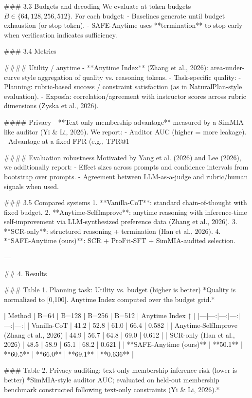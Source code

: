 ### 3.3 Budgets and decoding  
We evaluate at token budgets \(B \in \{64, 128, 256, 512\}\). For each budget:
- Baselines generate until budget exhaustion (or stop token).  
- SAFE-Anytime uses **termination** to stop early when verification indicates sufficiency.

### 3.4 Metrics  

#### Utility / anytime  
- **Anytime Index** (Zhang et al., 2026): area-under-curve style aggregation of quality vs. reasoning tokens.  
- Task-specific quality:
  - Planning: rubric-based success / constraint satisfaction (as in NaturalPlan-style evaluation).  
  - Exposía: correlation/agreement with instructor scores across rubric dimensions (Zyska et al., 2026).

#### Privacy  
- **Text-only membership advantage** measured by a SimMIA-like auditor (Yi & Li, 2026). We report:
  - Auditor AUC (higher = more leakage).  
  - Advantage at a fixed FPR (e.g., TPR@1%

#### Evaluation robustness  
Motivated by Yang et al. (2026) and Lee (2026), we additionally report:
- Effect sizes across prompts and confidence intervals from bootstrap over prompts.  
- Agreement between LLM-as-a-judge and rubric/human signals when used.

### 3.5 Compared systems  
1. **Vanilla-CoT**: standard chain-of-thought with fixed budget.  
2. **Anytime-SelfImprove**: anytime reasoning with inference-time self-improvement via LLM-synthesized preference data (Zhang et al., 2026).  
3. **SCR-only**: structured reasoning + termination (Han et al., 2026).  
4. **SAFE-Anytime (ours)**: SCR + ProFit-SFT + SimMIA-audited selection.

---

## 4. Results  

### Table 1. Planning task: Utility vs. budget (higher is better)  
*Quality is normalized to [0,100]. Anytime Index computed over the budget grid.*

| Method | B=64 | B=128 | B=256 | B=512 | Anytime Index ↑ |
|---|---:|---:|---:|---:|---:|
| Vanilla-CoT | 41.2 | 52.8 | 61.0 | 66.4 | 0.582 |
| Anytime-SelfImprove (Zhang et al., 2026) | 44.9 | 56.7 | 64.8 | 69.0 | 0.612 |
| SCR-only (Han et al., 2026) | 48.5 | 58.9 | 65.1 | 68.2 | 0.621 |
| **SAFE-Anytime (ours)** | **50.1** | **60.5** | **66.0** | **69.1** | **0.636** |

### Table 2. Privacy auditing: text-only membership inference risk (lower is better)  
*SimMIA-style auditor AUC; evaluated on held-out membership benchmark constructed following text-only constraints (Yi & Li, 2026).*


